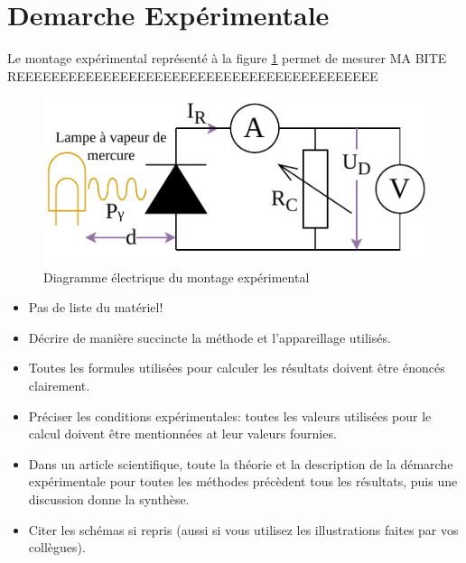 \section{Demarche Expérimentale}

Le montage expérimental représenté à la figure \ref{fig:montage} permet de mesurer MA BITE REEEEEEEEEEEEEEEEEEEEEEEEEEEEEEEEEEEEEEEEEE

\begin{figure}
    \centering
    \includegraphics[width=12cm]{figures/montage.pdf}
    \caption{Diagramme électrique du montage expérimental \cite{notice} \cite{nicole}}
    \label{fig:montage}
\end{figure}

\begin{itemize}
\item Pas de liste du matériel!
\item Décrire de manière succincte la méthode et l'appareillage utilisés. 
\item Toutes les formules utilisées pour calculer les résultats doivent être énoncés clairement.
\item Préciser les conditions expérimentales: toutes les valeurs utilisées pour le calcul doivent être mentionnées at leur valeurs fournies.
\item Dans un article scientifique, toute la théorie et la description de la démarche expérimentale pour toutes les méthodes précèdent tous les résultats, puis une discussion donne la synthèse.
\item Citer les schémas si repris (aussi si vous utilisez les illustrations faites par vos collègues).
\end{itemize}